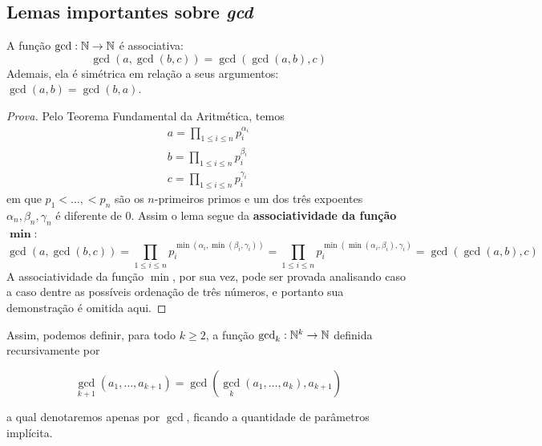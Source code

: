 \documentclass{article}
\begin{document}
\subsection{Lemas importantes sobre \emph{gcd}}
\begin{theorem}\label{associativity}
    A função \(\gcd: \mathbb{N} \to \mathbb{N}\) é associativa:
    \[\gcd(a, \gcd(b, c)) = \gcd(\gcd(a, b), c)\]
    Ademais, ela é simétrica em relação a seus argumentos: \(\gcd(a, b) = \gcd(b, a)\).
\end{theorem}
\begin{proof}[Prova]
    Pelo Teorema Fundamental da Aritmética, temos
    \begin{align*}
        a = \prod_{1 \leq i \leq n}p_i^{\alpha_i} \\
        b = \prod_{1 \leq i \leq n}p_i^{\beta_i} \\
        c = \prod_{1 \leq i \leq n}p_i^{\gamma_i}
    \end{align*}
    em que \(p_1 < \dotsc, < p_n\) são os \(n\)-primeiros primos e um dos três expoentes \(\alpha_n, \beta_n, \gamma_n\) é diferente de \(0\). Assim o lema segue da \textbf{associatividade da função \(\boldsymbol{\min}\)}: 
    \[\gcd(a, \gcd(b, c)) = \prod_{1 \leq i \leq n}p_i^{\min(\alpha_i, \min(\beta_i, \gamma_i))} = \prod_{1 \leq i \leq n}p_i^{\min(\min(\alpha_i, \beta_i), \gamma_i)} = \gcd(\gcd(a, b), c)\]
    A associatividade da função \(\min\), por sua vez, pode ser provada analisando caso a caso dentre as possíveis ordenação de três números, e portanto sua demonstração é omitida aqui.
\end{proof}


Assim, podemos definir, para todo \(k \geq 2\), a função \(\gcd_k: \mathbb{N}^k \to \mathbb{N}\) definida recursivamente por 
\begin{definition}\label{n-ary-gcd}
    \[\gcd_{k+1}(a_1, \dotsc, a_{k+1}) = \gcd(\gcd_{k}(a_1, \dotsc, a_k), a_{k+1})\]    
\end{definition}
a qual denotaremos apenas por \(\gcd\), ficando a quantidade de parâmetros implícita.
\end{document}
